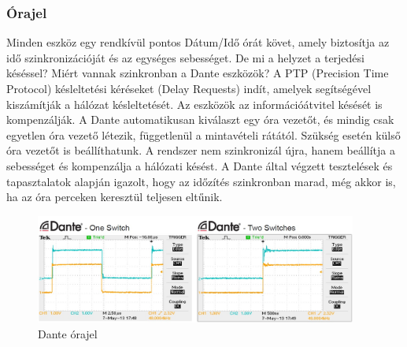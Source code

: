 \subsubsection{Órajel}
Minden eszköz egy rendkívül pontos Dátum/Idő órát követ, amely biztosítja az 
idő szinkronizációját és az egységes sebességet. De mi a helyzet a terjedési 
késéssel? Miért vannak szinkronban a Dante eszközök? A PTP (Precision Time Protocol) 
késleltetési kéréseket (Delay Requests) indít, amelyek segítségével kiszámítják 
a hálózat késleltetését. Az eszközök az információátvitel késését is kompenzálják. 
A Dante automatikusan kiválaszt egy óra vezetőt, és mindig csak egyetlen óra 
vezető létezik, függetlenül a mintavételi rátától. Szükség esetén külső óra 
vezetőt is beállíthatunk. A rendszer nem szinkronizál újra, hanem beállítja 
a sebességet és kompenzálja a hálózati késést. A Dante által végzett tesztelések 
és tapasztalatok alapján igazolt, hogy az időzítés szinkronban marad, még akkor 
is, ha az óra perceken keresztül teljesen eltűnik.
\begin{figure}[H]
	\centering
	\includegraphics[width=400px, keepaspectratio] {figures/dante-clocking.jpg}
	\caption{Dante órajel}
	\label{fig:dante-clock}
\end{figure}
